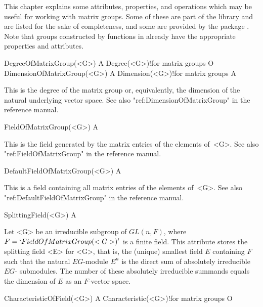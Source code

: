 


This chapter explains some attributes, properties, and operations which may
be useful for working with matrix groups. Some of these are part of the 
{\GAP} library and are listed for the sake of completeness, and some
are provided by the package {\IRREDSOL}. Note that  groups constructed
by functions in {\IRREDSOL} already have the appropriate properties and
attributes. 



\>DegreeOfMatrixGroup(<G>) A
\>Degree(<G>)!{for matrix groups} O
\>DimensionOfMatrixGroup(<G>) A
\>Dimension(<G>)!{for matrix groups} A

This is the degree of the matrix group or, equivalently, the dimension of the
natural underlying vector space. See also "ref:DimensionOfMatrixGroup" in the {\GAP} reference manual.

\>FieldOfMatrixGroup(<G>) A

This is the field generated by the matrix entries of the elements of~<G>. See also 
"ref:FieldOfMatrixGroup" in the {\GAP} reference manual.

\>DefaultFieldOfMatrixGroup(<G>) A

This is a field containing all matrix entries of the elements of~<G>. See also 
"ref:DefaultFieldOfMatrixGroup" in the {\GAP} reference manual.

\>SplittingField(<G>) A

Let <G> be an irreducible subgroup of $GL(n, F)$, where $F =  `FieldOfMatrixGroup(<G>)'$
is a finite field. This attribute stores the splitting field <E> for <G>, that is,
the (unique) smallest field $E$ containing $F$ such 
that the natural $E G$-module $E^n$ is the direct sum of absolutely irreducible $E G$-
submodules. The number of these absolutely irreducible summands equals the dimension of $E$
as an $F$-vector space.

\>CharacteristicOfField(<G>) A
\>Characteristic(<G>)!{for matrix groups} O

